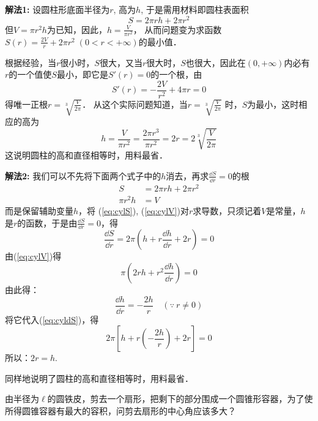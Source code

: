 \begin{solution}
\textbf{解法1:} 设圆柱形底面半径为$r$, 高为$h$, 于是需用材料即圆柱表面积
\[S=2\pi rh+2\pi r^2\]
但$V=\pi r^2h$为已知，因此，$h=\frac{V}{\pi r^2}$，
从而问题变为求函数$S(r)=\frac{2V}{r}+2\pi r^2\; (0<r<+\infty)$的最小值．

根据经验，当$r$很小时，$S$很大，又当$r$很大时，$S$也很大，因此在$(0,+\infty)$内必有$r$的一个值使$S$最小，即它是$S'(r)=0$的一个根，由
\[S' (r) =-\frac{2V}{r^2}+4\pi r=0\]
得唯一正根$r=\sqrt[3]{\frac{V}{2\pi}}$．
从这个实际问题知道，当$r=\sqrt[3]{\frac{V}{2\pi}}$
时，$S$为最小，这时相应的高为
\[h=\frac{V}{\pi r^2}=\frac{2\pi r^3}{\pi r^2}=2r=2\sqrt[3]{\frac{V}{2\pi}}\]
这说明圆柱的高和直径相等时，用料最省．

\textbf{解法2:}  我们可以不先将下面两个式子中的$h$消去，再求$\frac{\dd S}{\dd r}=0$的根
\begin{align}
    S&=2\pi r h+2\pi r^2 \label{eq:cylS}\\
    \pi r^2 h&=V \label{eq:cylV}
\end{align}
而是保留辅助变量$h$，将
(\ref{eq:cylS}), (\ref{eq:cylV})对$r$求导数，只须记着$V$是常量，$h$是$r$的函数，于是由$\frac{\dd S}{\dd r}=0$，得
\begin{equation}
    \frac{\dd S}{\dd r}=2\pi\left(h+r\frac{\dd h}{\dd r}+2r\right)=0 \label{eq:cyldS}
\end{equation}
由(\ref{eq:cylV})得
\begin{equation}
    \pi\left(2rh+r^2\frac{\dd h}{\dd r}\right)=0
\end{equation}
由此得：
\[\frac{\dd h}{\dd r}=-\frac{2h}{r}\quad (\because\ r\ne 0)\]
将它代入(\ref{eq:cyldS})，得
\[2\pi\left[h+r\left(-\frac{2h}{r}\right)+2r\right]=0\]
所以：$2r=h$. 

同样地说明了圆柱的高和直径相等时，用料最省．
\end{solution}


\begin{example}
由半径为$\ell$的圆铁皮，剪去一个扇形，把剩下的部分围成一个圆锥形容器，为了使所得圆锥容器有最大的容积，问剪去扇形的中心角应该多大？
\end{example}

